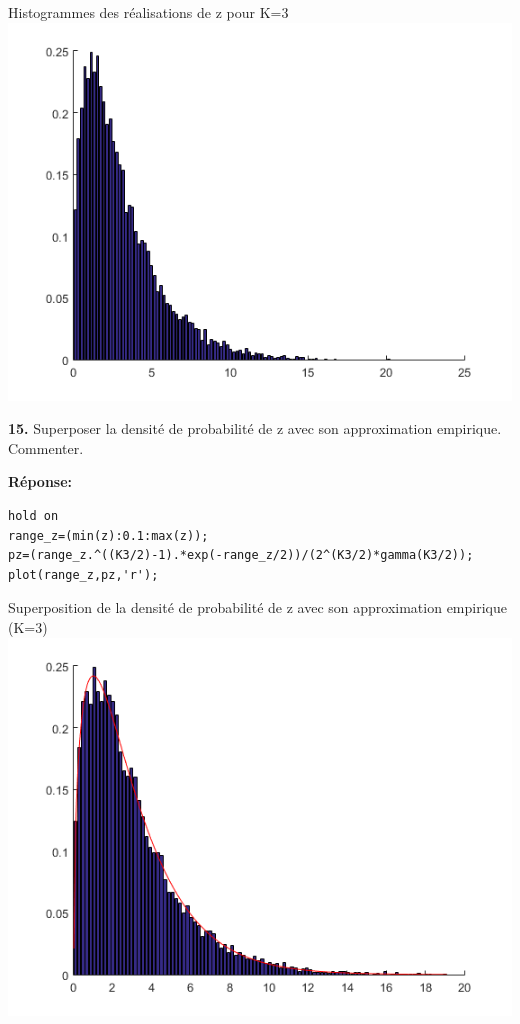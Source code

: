 \documentclass[12pt]{article}
\begin{document}
\begin{flushleft}
Histogrammes des réalisations de z pour K=3
\includegraphics{3_14.PNG}
\end{flushleft}

\smallbreak

\textbf{15. }Superposer la densité de probabilité de z avec son approximation empirique. Commenter.

\smallbreak
\textbf{Réponse:}
\begin{lstlisting}[style=Matlab-editor]
hold on
range_z=(min(z):0.1:max(z));
pz=(range_z.^((K3/2)-1).*exp(-range_z/2))/(2^(K3/2)*gamma(K3/2));
plot(range_z,pz,'r');
\end{lstlisting}

\clearpage

\begin{flushleft}
Superposition de la densité de probabilité de z avec son approximation empirique (K=3)
\includegraphics{3_15.PNG}
\end{flushleft}
\end{document}
